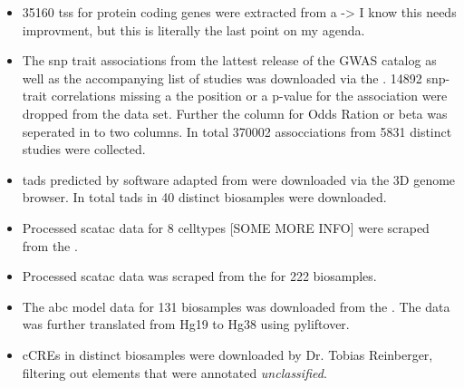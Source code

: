 \begin{itemize}
    \item {} 35160 \ac{tss} for protein coding genes were extracted from a  -> I know this needs improvment, but this is literally the last point on my agenda.

    \item {} The \ac{snp} trait associations from the lattest release of the GWAS catalog as well as the accompanying list of studies was downloaded via the . 14892 \ac{snp}-trait correlations missing a the position or a p-value for the association were dropped from the data set. Further the column for Odds Ration or beta was seperated in to two columns. In total 370002 assocciations from 5831 distinct studies were collected.

    \item {} \acp{tad} predicted by software adapted from \textcite{dixonTopologicalDomainsMammalian2012} were downloaded via the 3D genome browser. In total \acp{tad} in 40 distinct biosamples were downloaded.

    \item {} Processed sc\ac{atac} data for 8 celltypes [SOME MORE INFO] were scraped from the .

    \item {} Processed sc\ac{atac} data was scraped from the  for 222 biosamples.

    \item {} The \ac{abc} model data for 131 biosamples was downloaded from the . The data was further translated from Hg19 to Hg38 using pyliftover.

    \item {} \acp{cCRE} in  distinct biosamples were downloaded by Dr. Tobias Reinberger, filtering out elements that were annotated \textit{unclassified}.
\end{itemize}

